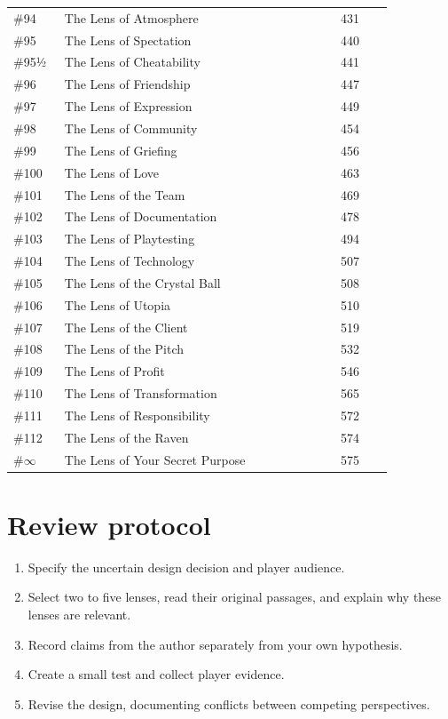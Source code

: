 \documentclass[11pt]{article}
\begin{document}
\begin{longtable}{@{}p{0.10\linewidth}p{0.63\linewidth}p{0.12\linewidth}@{}}
\#94 & The Lens of Atmosphere & 431 \\
\#95 & The Lens of Spectation & 440 \\
\#95½ & The Lens of Cheatability & 441 \\
\#96 & The Lens of Friendship & 447 \\
\#97 & The Lens of Expression & 449 \\
\#98 & The Lens of Community & 454 \\
\#99 & The Lens of Griefing & 456 \\
\#100 & The Lens of Love & 463 \\
\#101 & The Lens of the Team & 469 \\
\#102 & The Lens of Documentation & 478 \\
\#103 & The Lens of Playtesting & 494 \\
\#104 & The Lens of Technology & 507 \\
\#105 & The Lens of the Crystal Ball & 508 \\
\#106 & The Lens of Utopia & 510 \\
\#107 & The Lens of the Client & 519 \\
\#108 & The Lens of the Pitch & 532 \\
\#109 & The Lens of Profit & 546 \\
\#110 & The Lens of Transformation & 565 \\
\#111 & The Lens of Responsibility & 572 \\
\#112 & The Lens of the Raven & 574 \\
\#\ensuremath{\infty} & The Lens of Your Secret Purpose & 575 \\
\bottomrule\end{longtable}\normalsize

\section{Review protocol}
\begin{enumerate}
\item Specify the uncertain design decision and player audience.
\item Select two to five lenses, read their original passages, and explain why these lenses are relevant.
\item Record claims from the author separately from your own hypothesis.
\item Create a small test and collect player evidence.
\item Revise the design, documenting conflicts between competing perspectives.
\end{enumerate}
\end{document}
